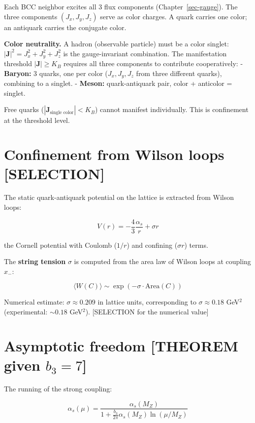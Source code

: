 \documentclass[
  11pt,
  letterpaper,
  twoside,
  openany]{book}
\makeatletter
\let\orig@section\section
\renewcommand{\section}{\needspace{8\baselineskip}\orig@section}
\makeatother
\begin{document}
Each BCC neighbor excites all 3 flux components
(Chapter~\ref{sec-gauge}). The three components \((J_x, J_y, J_z)\)
serve as color charges. A quark carries one color; an antiquark carries
the conjugate color.

\textbf{Color neutrality.} A hadron (observable particle) must be a
color singlet: \(|\mathbf{J}|^2 = J_x^2 + J_y^2 + J_z^2\) is the
gauge-invariant combination. The manifestation threshold
\(|\mathbf{J}| \geq K_B\) requires all three components to contribute
cooperatively: - \textbf{Baryon:} 3 quarks, one per color
(\(J_x, J_y, J_z\) from three different quarks), combining to a singlet.
- \textbf{Meson:} quark-antiquark pair, color + anticolor = singlet.

Free quarks (\(|\mathbf{J}_{\text{single color}}| < K_B\)) cannot
manifest individually. This is confinement at the threshold level.

\section{Confinement from Wilson loops
{[}SELECTION{]}}\label{confinement-from-wilson-loops-selection}

The static quark-antiquark potential on the lattice is extracted from
Wilson loops:

\[
V(r) = -\frac{4}{3}\frac{\alpha_s}{r} + \sigma r
\tag{18.2}
\]

the Cornell potential with Coulomb (\(1/r\)) and confining
(\(\sigma r\)) terms.

The \textbf{string tension} \(\sigma\) is computed from the area law of
Wilson loops at coupling \(x_-\):

\[
\langle W(C) \rangle \sim \exp(-\sigma \cdot \text{Area}(C))
\tag{18.3}
\]

Numerical estimate: \(\sigma \approx 0.209\) in lattice units,
corresponding to \(\sigma \approx 0.18\) GeV\(^2\) (experimental:
\(\sim 0.18\) GeV\(^2\)). {[}SELECTION for the numerical value{]}

\section{\texorpdfstring{Asymptotic freedom {[}THEOREM given
\(b_3 = 7\){]}}{Asymptotic freedom {[}THEOREM given b\_3 = 7{]}}}\label{asymptotic-freedom-theorem-given-b_3-7}

The running of the strong coupling:

\[
\alpha_s(\mu) = \frac{\alpha_s(M_Z)}{1 + \frac{b_3}{2\pi}\alpha_s(M_Z)\ln(\mu/M_Z)}
\tag{18.4}
\]
\end{document}
